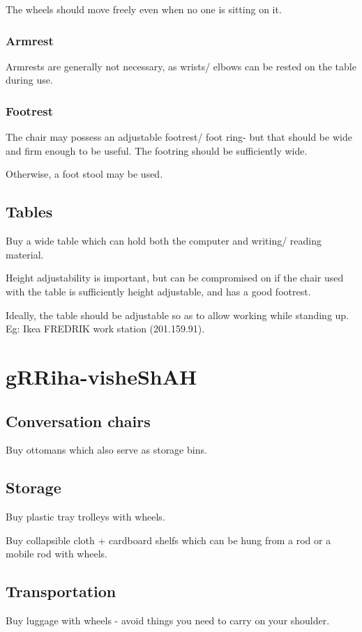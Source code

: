 \documentclass[oneside, article]{memoir}
\begin{document}
The wheels should move freely even when no one is sitting on it.

\section{Armrest}
Armrests are generally not necessary, as wrists/ elbows can be rested on the table during use.

\section{Footrest}
The chair may possess an adjustable footrest/ foot ring- but that should be wide and firm enough to be useful. The footring should be sufficiently wide.

Otherwise, a foot stool may be used.

\chapter{Tables}
Buy a wide table which can hold both the computer and writing/ reading material.

Height adjustability is important, but can be compromised on if the chair used with the table is sufficiently height adjustable, and has a good footrest.

Ideally, the table should be adjustable so as to allow working while standing up. Eg: Ikea FREDRIK work station (201.159.91).


\part{gRRiha-visheShAH}
\chapter{Conversation chairs}
Buy ottomans which also serve as storage bins.

\chapter{Storage}
Buy plastic tray trolleys with wheels.

Buy collapsible cloth + cardboard shelfs which can be hung from a rod or a mobile rod with wheels.

\chapter{Transportation}
Buy luggage with wheels - avoid things you need to carry on your shoulder.
\end{document}
